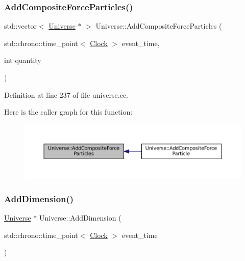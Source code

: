 \subsubsection{\texorpdfstring{Add\+Composite\+Force\+Particles()}{AddCompositeForceParticles()}}
{\footnotesize\ttfamily std\+::vector$<$ \mbox{\hyperlink{class_universe}{Universe}} $\ast$ $>$ Universe\+::\+Add\+Composite\+Force\+Particles (\begin{DoxyParamCaption}\item[{std\+::chrono\+::time\+\_\+point$<$ \mbox{\hyperlink{universe_8h_a0ef8d951d1ca5ab3cfaf7ab4c7a6fd80}{Clock}} $>$}]{event\+\_\+time,  }\item[{int}]{quantity }\end{DoxyParamCaption})}



Definition at line 237 of file universe.\+cc.

Here is the caller graph for this function\+:\nopagebreak
\begin{figure}[H]
\begin{center}
\leavevmode
\includegraphics[width=350pt]{class_universe_a23d74e377203fca7cb74e0ffee7244b6_icgraph}
\end{center}
\end{figure}
\mbox{\label{class_universe_a6326158c47bf3f7fe9297299a9b5b7b7}} 
\subsubsection{\texorpdfstring{Add\+Dimension()}{AddDimension()}}
{\footnotesize\ttfamily \mbox{\hyperlink{class_universe}{Universe}} $\ast$ Universe\+::\+Add\+Dimension (\begin{DoxyParamCaption}\item[{std\+::chrono\+::time\+\_\+point$<$ \mbox{\hyperlink{universe_8h_a0ef8d951d1ca5ab3cfaf7ab4c7a6fd80}{Clock}} $>$}]{event\+\_\+time }\end{DoxyParamCaption})}



